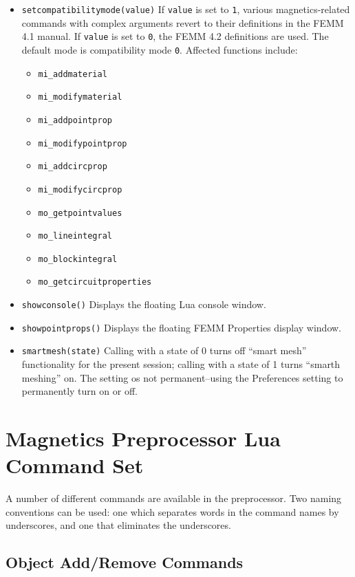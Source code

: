 \begin{itemize}
\item {\tt setcompatibilitymode(value)} If {\tt value} is set to {\tt 1}, various magnetics-related
commands with complex arguments revert to their definitions in the FEMM 4.1 manual.  If {\tt value} is
set to {\tt 0}, the FEMM 4.2 definitions are used.  The default mode is compatibility mode {\tt 0}. Affected functions include:
\begin{itemize}
\item {\tt mi\_addmaterial}
\item {\tt mi\_modifymaterial}
\item {\tt mi\_addpointprop}
\item {\tt mi\_modifypointprop}
\item {\tt mi\_addcircprop}
\item {\tt mi\_modifycircprop}
\item {\tt mo\_getpointvalues}
\item {\tt mo\_lineintegral}
\item {\tt mo\_blockintegral}
\item {\tt mo\_getcircuitproperties}
\end{itemize}

\item{\tt showconsole()} Displays the floating Lua console window.

\item{\tt showpointprops()} Displays the floating FEMM Properties
display window.

\item{\tt smartmesh(state)} Calling with a state of 0 turns off ``smart mesh'' functionality for the present session; calling with a state of 1 turns ``smarth meshing'' on.
The setting os not permanent--using the Preferences setting to permanently turn on or off.

\end{itemize}


\section{Magnetics Preprocessor Lua Command Set}

A number of different commands are available in the preprocessor.
Two naming conventions can be used: one which separates words in
the command names by underscores, and one that eliminates the
underscores.

\subsection{Object Add/Remove Commands}

